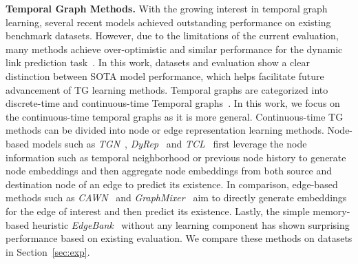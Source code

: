 \textbf{Temporal Graph Methods.}
With the growing interest in temporal graph learning, several recent models achieved outstanding performance on existing benchmark datasets. However, due to the limitations of the current evaluation, many methods achieve over-optimistic and similar performance for the dynamic link prediction task~\cite{wanginductive,rossi2020temporal,congwe,souza2022provably,luoneighborhood,kumar2019predicting}. In this work, \name datasets and evaluation show a clear distinction between SOTA model performance, which helps facilitate future advancement of TG learning methods. Temporal graphs are categorized into discrete-time and continuous-time Temporal graphs~\cite{kazemi2020representation}. In this work, we focus on the continuous-time temporal graphs as it is more general. Continuous-time TG methods can be divided into node or edge representation learning methods. Node-based models such as \textit{TGN}~\cite{rossi2020temporal}, \textit{DyRep}~\cite{trivedi2019dyrep} and \textit{TCL}~\cite{wang2021tcl} first leverage the node information such as temporal neighborhood or previous node history to generate node embeddings and then aggregate node embeddings from both source and destination node of an edge to predict its existence. In comparison, edge-based methods such as \textit{CAWN}~\cite{wanginductive} and \textit{GraphMixer}~\cite{congwe} aim to directly generate embeddings for the edge of interest and then predict its existence. Lastly, the simple memory-based heuristic \emph{EdgeBank}~\cite{poursafaeitowards} without any learning component has shown surprising performance based on existing evaluation. We compare these methods on \name datasets in Section~\ref{sec:exp}. 


